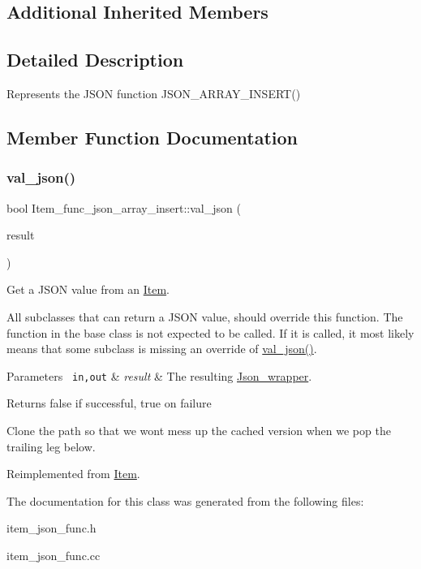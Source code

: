 \subsection*{Additional Inherited Members}


\subsection{Detailed Description}
Represents the J\+S\+ON function J\+S\+O\+N\+\_\+\+A\+R\+R\+A\+Y\+\_\+\+I\+N\+S\+E\+R\+T() 

\subsection{Member Function Documentation}
\mbox{\label{classItem__func__json__array__insert_a967c286607ca60e2e3b7e2771eab26d0}} 
\subsubsection{\texorpdfstring{val\+\_\+json()}{val\_json()}}
{\footnotesize\ttfamily bool Item\+\_\+func\+\_\+json\+\_\+array\+\_\+insert\+::val\+\_\+json (\begin{DoxyParamCaption}\item[{\mbox{\hyperlink{classJson__wrapper}{Json\+\_\+wrapper}} $\ast$}]{result }\end{DoxyParamCaption})\hspace{0.3cm}{\ttfamily [virtual]}}

Get a J\+S\+ON value from an \mbox{\hyperlink{classItem}{Item}}.

All subclasses that can return a J\+S\+ON value, should override this function. The function in the base class is not expected to be called. If it is called, it most likely means that some subclass is missing an override of \mbox{\hyperlink{classItem__func__json__array__insert_a967c286607ca60e2e3b7e2771eab26d0}{val\+\_\+json()}}.


\begin{DoxyParams}[1]{Parameters}
\mbox{\texttt{ in,out}}  & {\em result} & The resulting \mbox{\hyperlink{classJson__wrapper}{Json\+\_\+wrapper}}.\\
\hline
\end{DoxyParams}
\begin{DoxyReturn}{Returns}
false if successful, true on failure 
\end{DoxyReturn}
Clone the path so that we won\textquotesingle{}t mess up the cached version when we pop the trailing leg below.

Reimplemented from \mbox{\hyperlink{classItem_a57e763fcde2d0a819d21e31c59611290}{Item}}.



The documentation for this class was generated from the following files\+:\begin{DoxyCompactItemize}
\item 
item\+\_\+json\+\_\+func.\+h\item 
item\+\_\+json\+\_\+func.\+cc\end{DoxyCompactItemize}
